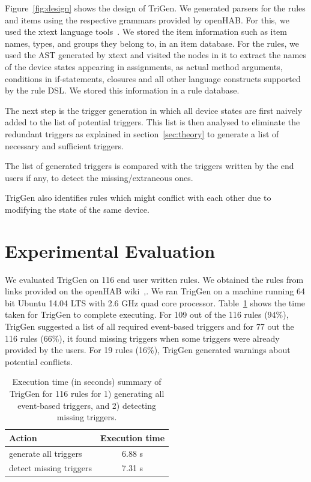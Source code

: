 \documentclass{sig-alternate-05-2015}
\begin{document}
Figure~\ref{fig:design} shows the design of TriGen. We generated parsers for the rules and items using the respective grammars provided by openHAB. For this, we used the xtext language tools~\cite{xtext}. We stored the item information such as item names, types, and groups they belong to, in an item database. For the rules, we used the AST generated by xtext and visited the nodes in it to extract the names of the device states appearing in assignments, as actual method arguments, conditions in if-statements, closures and all other language constructs supported by the rule DSL. We stored this information in a rule database. 

The next step is the trigger generation in which all device states are first naively added to the list of potential triggers. This list is then analysed to eliminate the redundant triggers as explained in section~\ref{sec:theory} to generate a list of necessary and sufficient triggers. 

The list of generated triggers is compared with the triggers written by the end users if any, to detect the missing/extraneous ones.

TrigGen also identifies rules which might conflict with each other due to modifying the state of the same device. 

 
\section{Experimental Evaluation}
We evaluated TrigGen on 116 end user written rules. We obtained the rules from links provided on the openHAB wiki~\cite{data1},\cite{data2}. We ran TrigGen on a machine running 64 bit Ubuntu 14.04 LTS with 2.6 GHz quad core processor. Table~\ref{tab:time} shows the time taken for TrigGen to complete executing.
For 109 out of the 116 rules (94\%), TrigGen suggested a list of all required event-based triggers and for 77 out the 116 rules (66\%), it found missing triggers when some triggers were already provided by the users. For 19 rules (16\%), TrigGen generated warnings about potential conflicts. 

\begin{table}[ht]
\centering
\begin{tabular}{|l|c|}
\hline
Action & Execution time\\ \hline
generate all triggers & 6.88 s \\ \hline
detect missing triggers & 7.31 s \\\hline
\end{tabular}
\caption{Execution time  (in seconds) summary of TrigGen for 116 rules for 1) generating all event-based triggers, and 2) detecting missing triggers. }
\label{tab:time}
\end{table}
\end{document}
